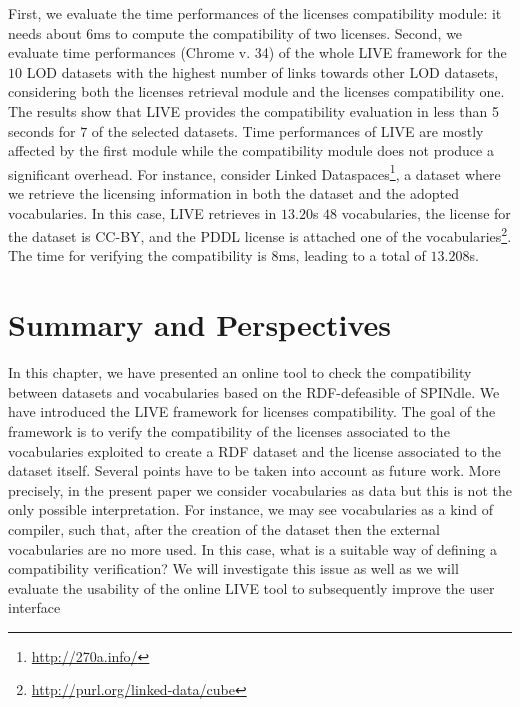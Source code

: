 First, we evaluate the time performances of the licenses compatibility module: it needs about 6ms to compute the compatibility of two licenses. Second, we evaluate time performances (Chrome v. 34) of the whole LIVE framework for the $10$ LOD datasets with the highest number of links towards other LOD datasets, considering both the licenses retrieval module and the licenses compatibility one. The results show that LIVE provides the compatibility evaluation in less than 5 seconds for $7$ of the selected datasets. Time performances of LIVE are mostly affected by the first module while the compatibility module does not produce a significant overhead. For instance, consider Linked Dataspaces\footnote{\url{http://270a.info/}}, a dataset where we retrieve the licensing information in both the dataset and the adopted vocabularies. In this case, LIVE retrieves in $13.20$s $48$ vocabularies, the license for the dataset is CC-BY, and the PDDL license is attached one of the vocabularies\footnote{\url{http://purl.org/linked-data/cube}}. The time for verifying the compatibility is $8$ms, leading to a total of $13.208$s.


\section{Summary and Perspectives}
\label{sec:summary-ch6}
In this chapter, we have presented an online tool to check the compatibility between datasets and vocabularies based on the RDF-defeasible of SPINdle. We have introduced the LIVE framework for licenses compatibility. The goal of the framework is to verify the compatibility of the licenses associated to the vocabularies exploited to create a RDF dataset and the license associated to the dataset itself. Several points have to be taken into account as future work. More precisely, in the present paper we consider vocabularies as data but this is not the only possible interpretation. For instance, we may see vocabularies as a kind of compiler, such that, after the creation of the dataset then the external vocabularies are no more used. In this case, what is a suitable way of defining a compatibility verification? We will investigate this issue as well as we will evaluate the usability of the online LIVE tool to subsequently improve the user interface


